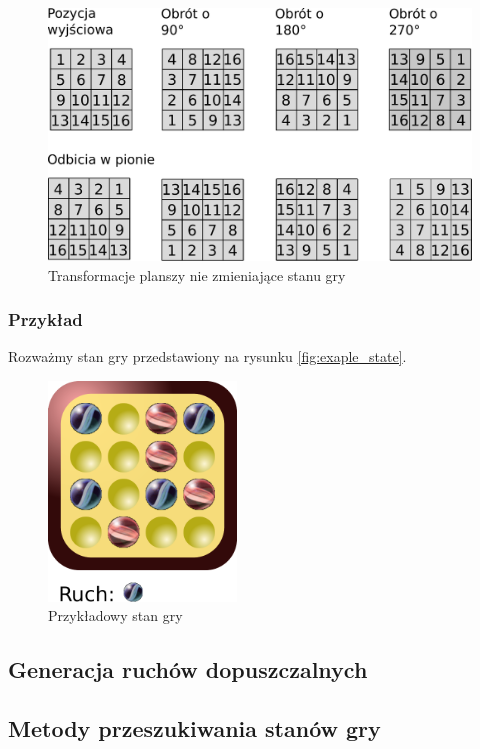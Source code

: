 \documentclass{scrartcl}
\begin{document}
\begin{figure}[h]
  \centering
  \includegraphics[width=\textwidth]{data/field_order2.pdf}
  \caption{Transformacje planszy nie zmieniające stanu gry}
  \label{fig:field_order2}
\end{figure}


\subsubsection{Przykład}

Rozważmy stan gry przedstawiony na rysunku \ref{fig:exaple_state}.

\begin{figure}[h!]
  \centering
  \includegraphics[width=5cm]{data/example_board.pdf}
  \caption{Przykładowy stan gry}
  \label{fig:example_state}
\end{figure}


\subsection{Generacja ruchów dopuszczalnych}

\subsection{Metody przeszukiwania stanów gry}
\end{document}
